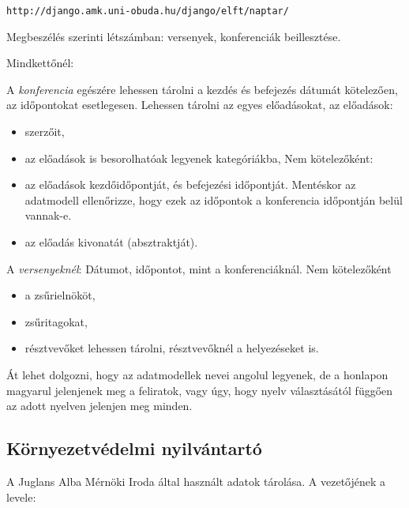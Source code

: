 \documentclass[a4paper]{article}
\begin{document}
\verb!http://django.amk.uni-obuda.hu/django/elft/naptar/!

Megbeszélés szerinti létszámban: versenyek, konferenciák beillesztése.

Mindkettőnél:

A \emph{konferencia} egészére lehessen tárolni a kezdés és befejezés dátumát
kötelezően, az időpontokat esetlegesen.
Lehessen tárolni az egyes előadásokat,
az előadások:
\begin{itemize}
    \item szerzőit,
    \item az előadások is besorolhatóak legyenek kategóriákba,
	Nem kötelezőként:
    \item az előadások kezdőidőpontját, és befejezési
	időpontját. Mentéskor az adatmodell ellenőrizze, hogy ezek az időpontok
	a konferencia időpontján belül vannak-e.
    \item az előadás kivonatát (absztraktját).
\end{itemize}

A \emph{versenyeknél}:
Dátumot, időpontot, mint a konferenciáknál.
Nem kötelezőként
\begin{itemize}
    \item a zsűrielnököt,
    \item zsűritagokat,
    \item résztvevőket lehessen tárolni, résztvevőknél a helyezéseket is.
\end{itemize}

Át lehet dolgozni, hogy az adatmodellek nevei angolul legyenek, de a
honlapon magyarul jelenjenek meg a feliratok, vagy úgy, hogy nyelv
választásától függően az adott nyelven jelenjen meg minden.

\subsection{Környezetvédelmi nyilvántartó}

A Juglans Alba Mérnöki Iroda által használt adatok tárolása. A
vezetőjének a levele:
\end{document}
